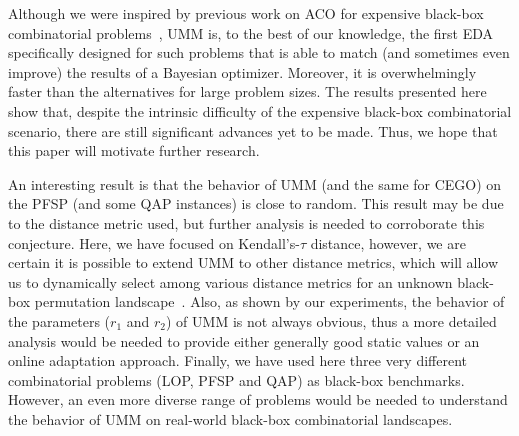 \documentclass[sigconf,dvipsnames]{acmart}
\begin{document}
Although we were inspired by previous work on ACO for expensive black-box
combinatorial problems~\citep{PerLopStu2015si}, UMM is, to the best of our
knowledge, the first EDA specifically designed for such problems that is able
to match (and sometimes even improve) the results of a Bayesian
optimizer. Moreover, it is overwhelmingly faster than the alternatives for
large problem sizes.  The results presented here show that, despite the
intrinsic difficulty of the expensive black-box combinatorial scenario, there
are still significant advances yet to be made. Thus, we hope that this paper
will motivate further research. %

An interesting result is that the behavior of UMM (and the same for CEGO) on
the PFSP (and some QAP instances) is close to random. %
This result may be due to the distance
metric used, but further analysis is needed to corroborate this
conjecture. Here, we have focused on Kendall's-$\tau$ distance, however, we are certain it is
possible to extend UMM to other distance metrics, which will allow us to
dynamically select among various distance metrics for an unknown black-box
permutation landscape~\citep{ZaeStoBar2014:ppsn}. Also, as shown by our
experiments, the behavior of the parameters ($r_1$ and $r_2$) of UMM is not
always obvious, thus a more detailed analysis would be needed to provide either
generally good static values or an online adaptation approach. Finally, we have
used here three very different combinatorial problems (LOP, PFSP and QAP) as
black-box benchmarks. However, an even more diverse range of problems would be
needed to understand the behavior of UMM on real-world black-box combinatorial
landscapes.



\end{document}

